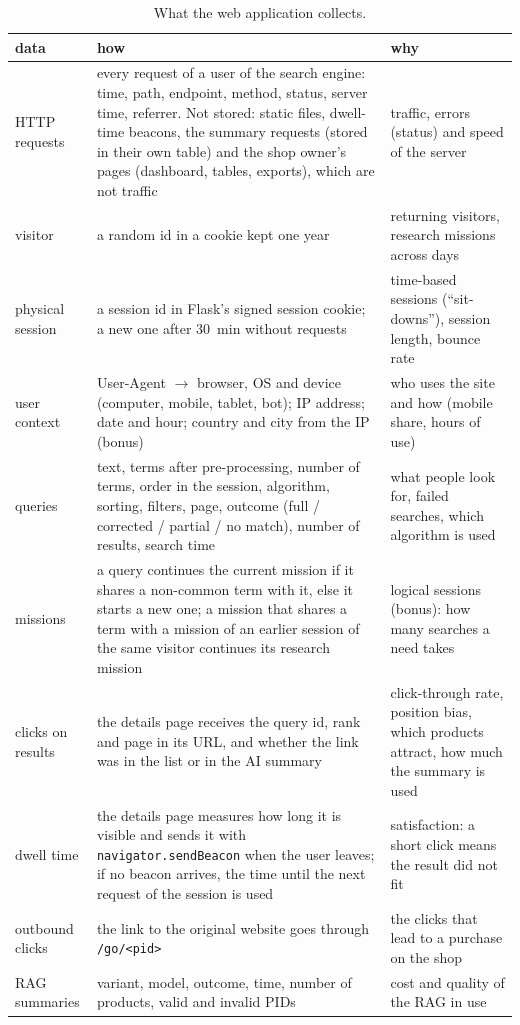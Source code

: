 \documentclass[11pt,a4paper]{article}
\newcommand{\code}[1]{\texttt{#1}}
\begin{document}
\begin{table}[H]
\centering\small
\caption{What the web application collects.}
\label{tab:collect}
\begin{tabularx}{\textwidth}{@{}>{\raggedright}p{3.0cm}YY@{}}
\toprule
data & how & why\\
\midrule
HTTP requests & every request of a user of the search engine: time, path, endpoint, method, status, server time,
referrer. Not stored: static files, dwell-time beacons, the summary requests (stored in their own table) and the shop
owner's pages (dashboard, tables, exports), which are not traffic & traffic,
errors (status) and speed of the server\\
visitor & a random id in a cookie kept one year & returning visitors, research missions across days\\
physical session & a session id in Flask's signed session cookie; a new one after 30~min without requests & time-based
sessions (``sit-downs''), session length, bounce rate\\
user context & User-Agent $\to$ browser, OS and device (computer, mobile, tablet, bot); IP address; date and hour;
country and city from the IP (bonus) & who uses the site and how (mobile share, hours of use)\\
queries & text, terms after pre-processing, number of terms, order in the session, algorithm, sorting, filters,
page, outcome (full / corrected / partial / no match), number of results, search time & what people look for, failed
searches, which algorithm is used\\
missions & a query continues the current mission if it shares a non-common term with it, else it starts a new one;
a mission that shares a term with a mission of an earlier session of the same visitor continues its research mission
& logical sessions (bonus): how many searches a need takes\\
clicks on results & the details page receives the query id, rank and page in its URL, and whether the link was in
the list or in the AI summary & click-through rate, position bias, which products attract, how much the summary is
used\\
dwell time & the details page measures how long it is visible and sends it with \code{navigator.sendBeacon} when the
user leaves; if no beacon arrives, the time until the next request of the session is used & satisfaction: a short
click means the result did not fit\\
outbound clicks & the link to the original website goes through \code{/go/<pid>} & the clicks that lead to a purchase
on the shop\\
RAG summaries & variant, model, outcome, time, number of products, valid and invalid PIDs & cost and quality of the
RAG in use\\
\bottomrule
\end{tabularx}
\end{table}
\end{document}
